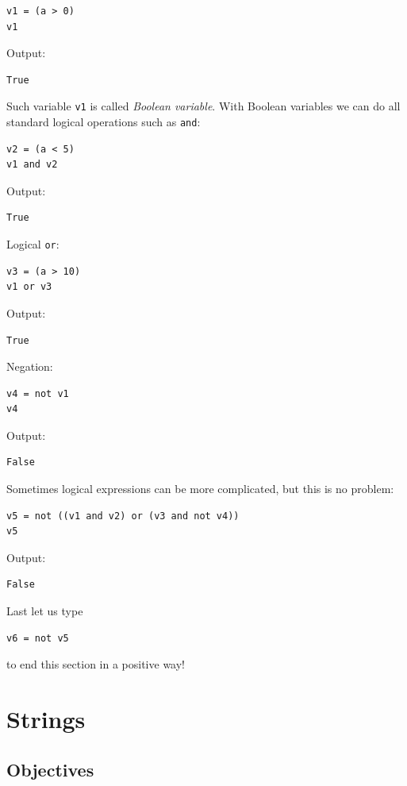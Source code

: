 \documentclass[article,A4,12pt]{llncs}
\begin{document}
\begin{verbatim}
v1 = (a > 0)
v1
\end{verbatim}
Output:

\begin{verbatim}
True
\end{verbatim}
Such variable {\tt v1} is called {\em Boolean variable}. With Boolean variables we can do all standard 
logical operations such as {\tt and}:

\begin{verbatim}
v2 = (a < 5)
v1 and v2
\end{verbatim}
Output:

\begin{verbatim}
True
\end{verbatim}
Logical {\tt or}:

\begin{verbatim}
v3 = (a > 10)
v1 or v3
\end{verbatim}
Output:

\begin{verbatim}
True
\end{verbatim}
Negation:

\begin{verbatim}
v4 = not v1
v4
\end{verbatim}
Output:

\begin{verbatim}
False
\end{verbatim}
Sometimes logical expressions can be more complicated, but this is no problem:

\begin{verbatim}
v5 = not ((v1 and v2) or (v3 and not v4))
v5
\end{verbatim}
Output:

\begin{verbatim}
False
\end{verbatim}
Last let us type

\begin{verbatim}
v6 = not v5
\end{verbatim}
to end this section in a positive way!

\section{Strings}

\subsection{Objectives}
\end{document}
